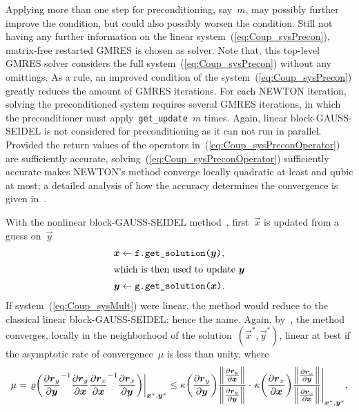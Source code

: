 \documentclass[10pt, ngerman, english,
twoside, open=right,
numbers=noenddot,
declaration=section,
abstract=section,
abstract=multiple,
abstract=notoc,
declaration=notoc,
cd=pale, 
chapterprefix=off, 
chapterpage=false, 
headingsvskip=-10em,
cdgeometry=custom, 
slantedgreek=on,
cdmath=on, 
cdfont=on,
ttfont=false,
mathswap=off,
]{tudscrreprt}
\numberwithin{equation}{chapter}
\renewcommand{\textsc}[1]{\uppercase{\mbox{#1}}}
\newcommand{\sidenote}[1]{
  \leavevmode %
  \marginpar{\hyphenpenalty=1000 \flushleft{\textcolor{HKS41}{#1}}}}
\begin{document}
\begin{itemize}
Applying more than one step for preconditioning, say~$m$, may possibly further improve the condition, but could also possibly worsen the condition.
Still not having any further information on the linear system~(\ref{eq:Coup_sysPrecon}), matrix-free restarted GMRES is chosen as solver. Note that, this top-level GMRES solver considers the full system~(\ref{eq:Coup_sysPrecon}) without any omittings. As a rule, an improved condition of the system~(\ref{eq:Coup_sysPrecon}) greatly reduces the amount of GMRES iterations. 
For each \textsc{Newton} iteration, solving the preconditioned system requires several GMRES iterations, in which the preconditioner must apply~\texttt{get\_update}~$m$ times. 
Again, linear block-\textsc{Gau\ss}-\textsc{Seidel} is not considered for preconditioning as it can not run in parallel. 
Provided the return values of the operators in~(\ref{eq:Coup_sysPreconOperator}) are sufficiently accurate, solving~(\ref{eq:Coup_sysPreconOperator}) sufficiently accurate makes \textsc{Newton}'s method converge locally quadratic at least and qubic at most; a detailed analysis of how the accuracy determines the convergence is given in~\cite{Dembo}.
\end{itemize}
\sidenote{\textsc{Gau\ss}-\textsc{Seidel} Method}With the nonlinear block-\textsc{Gau\ss}-\textsc{Seidel} method~\cite[see][Eq.~7.4.26]{Ortega}, first~$\vec{x}$ is updated from a guess on~$\vec{y}$
\begin{subequations}
\begin{align}
\vec{x} &\gets \texttt{f.get\_solution($\vec{y}$)}\text{,}\\*
\intertext{which is then used to update~$\vec{y}$}
\vec{y} &\gets \texttt{g.get\_solution($\vec{x}$)}\text{.}
\end{align}
\end{subequations}
If system~(\ref{eq:Coup_sysMult}) were linear, the method would reduce to the classical linear block-\textsc{Gau\ss}-\textsc{Seidel}; hence the name. Again, by~\cite[see][Th.~10.3.5]{Ortega}, the method converges, locally in the neighborhood of the solution~$(\vec{x}^*, \vec{y}^*)$, linear at best if the asymptotic rate of convergence~$\mu$ is less than unity, where
\begin{equation}
\mu = \at{\varrho\left( \pdiff{\vec{r}_y}{\vec{y}}^{-1} \pdiff{\vec{r}_y}{\vec{x}} \pdiff{\vec{r}_x}{\vec{x}}^{-1} \pdiff{\vec{r}_x}{\vec{y}} \right)}{\vec{x}^*, \vec{y}^*} \leq \kappa\left( \pdiff{\vec{r}_y}{\vec{y}} \right)\frac{\norm{\pdiff{\vec{r}_y}{\vec{x}}}}{\norm{\pdiff{\vec{r}_y}{\vec{y}}}} \cdot \at{\kappa\left( \pdiff{\vec{r}_x}{\vec{x}} \right)\frac{\norm{\pdiff{\vec{r}_x}{\vec{y}}}}{\norm{\pdiff{\vec{r}_x}{\vec{x}\vphantom{\vec{y}}}}}}{\vec{x}^*, \vec{y}^*}\text{,}\label{eq:Coup_convGS}
\end{equation}
\end{document}
